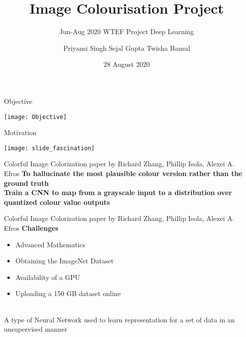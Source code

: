 \documentclass[12pt]{beamer}
\title[Image-Colourization]{Image Colourisation Project}
\subtitle{Jun-Aug 2020 {\textbar} WTEF Project {\textbar} Deep Learning}
\author[Team-9]{Priyansi Singh {\textbar} Sejal Gupta {\textbar} Twisha Bansal}
\date{28 August 2020}
\begin{document}
\begin{frame}
        \titlepage
\end{frame}

\begin{frame}{Objective}
	\begin{center}
		\texttt{[image: Objective]}
	\end{center}
\end{frame}

\begin{frame}{Motivation}
	\begin{center}
		\texttt{[image: slide\_fascination]}
	\end{center}
\end{frame}

\begin{frame}[standout]
\end{frame}

\begin{frame}{Colorful Image Colorization paper by Richard Zhang, Phillip Isola, Alexei A. Efros}
	\textbf{To hallucinate the most plausible colour version rather than the ground truth}\\
	\vspace{10 mm}
	\pause
	\textbf{Train a CNN to map from a grayscale input to a distribution over quantized
	colour value outputs}
\end{frame}

\begin{frame}{Colorful Image Colorization paper by Richard Zhang, Phillip Isola, Alexei A. Efros}
	\textbf{Challenges}\\
	\begin{itemize}
		\item Advanced Mathematics
		\item Obtaining the ImageNet Dataset
		\item Availability of a GPU
		\item Uploading a 150 GB dataset online
	\end{itemize}
\end{frame}

\begin{frame}[standout]
	\\
	A type of Neural Network used to learn representation for a set of data in an unsupervised manner
\end{frame}
\end{document}
